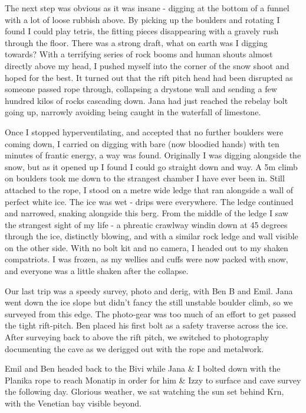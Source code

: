 The next step was obvious as it was insane - digging at the bottom of a
funnel with a lot of loose rubbish above. By picking up the boulders and
rotating I found I could play tetris, the fitting pieces disappearing
with a gravely rush through the floor. There was a strong draft, what on
earth was I digging towards? With a terrifying series of rock booms and
human shouts almost directly above my head, I pushed myself into the
corner of the snow shoot and hoped for the best. It turned out that the
rift pitch head had been disrupted as someone passed rope through,
collapsing a drystone wall and sending a few hundred kilos of rocks
cascading down. Jana had just reached the rebelay bolt going up,
narrowly avoiding being caught in the waterfall of limestone.

Once I stopped hyperventilating, and accepted that no further boulders
were coming down, I carried on digging with bare (now bloodied hands)
with ten minutes of frantic energy, a way was found. Originally I was
digging alongside the snow, but as it opened up I found I could go
straight down and way. A 5m climb on boulders took me down to the
strangest chamber I have ever been in. Still attached to the rope, I
stood on a metre wide ledge that ran alongside a wall of perfect white
ice. The ice was wet - drips were everywhere. The ledge continued and
narrowed, snaking alongside this berg. From the middle of the ledge I
saw the strangest sight of my life - a phreatic crawlway windin down at
45 degrees through the ice, distinctly blowing, and with a similar rock
ledge and wall visible on the other side. With no bolt kit and no
camera, I headed out to my shaken compatriots. I was frozen, as my
wellies and cuffs were now packed with snow, and everyone was a little
shaken after the collapse.

Our last trip was a speedy survey, photo and derig, with Ben B and Emil.
Jana went down the ice slope but didn't fancy the still unstable boulder
climb, so we surveyed from this edge. The photo-gear was too much of an
effort to get passed the tight rift-pitch. Ben placed his first bolt as
a safety traverse across the ice. After surveying back to above the rift
pitch, we switched to photography documenting the cave as we derigged
out with the rope and metalwork.

Emil and Ben headed back to the Bivi while Jana \& I bolted down with
the Planika rope to reach Monatip in order for him \& Izzy to surface
and cave survey the following day. Glorious weather, we sat watching the
sun set behind Krn, with the Venetian bay visible beyond.

